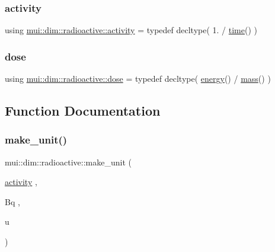 \subsubsection{\texorpdfstring{activity}{activity}}
{\footnotesize\ttfamily using \hyperlink{namespacemui_1_1dim_1_1radioactive_ab65095d53a55c6837149c27823f0b979}{mui\+::dim\+::radioactive\+::activity} = typedef decltype( 1. / \hyperlink{namespacemui_1_1dim_a3d3a0014025f1c2c0dd7418791928500}{time}() )}

\mbox{\label{namespacemui_1_1dim_1_1radioactive_a809b4779555da397d5d57f8570f7cd17}} 
\subsubsection{\texorpdfstring{dose}{dose}}
{\footnotesize\ttfamily using \hyperlink{namespacemui_1_1dim_1_1radioactive_a809b4779555da397d5d57f8570f7cd17}{mui\+::dim\+::radioactive\+::dose} = typedef decltype( \hyperlink{namespacemui_1_1dim_a00e1931b1f70586e0983e317bfafb793}{energy}() / \hyperlink{namespacemui_1_1dim_a7b17424f4316e37d7970ee09857ccddf}{mass}() )}



\subsection{Function Documentation}
\mbox{\label{namespacemui_1_1dim_1_1radioactive_ae47c7062a62eb0295c6bb2e3166b068e}} 
\subsubsection{\texorpdfstring{make\+\_\+unit()}{make\_unit()}}
{\footnotesize\ttfamily mui\+::dim\+::radioactive\+::make\+\_\+unit (\begin{DoxyParamCaption}\item[{\hyperlink{namespacemui_1_1dim_1_1radioactive_ab65095d53a55c6837149c27823f0b979}{activity}}]{,  }\item[{Bq}]{,  }\item[{u}]{ }\end{DoxyParamCaption})}



